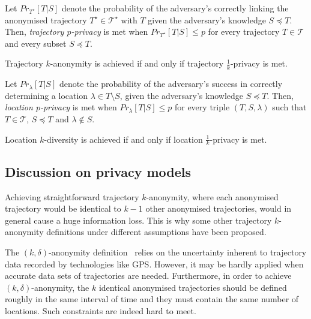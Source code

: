 \begin{definition} \label{def:trajectory_private}
Let $Pr_{T^{\star}}[T|S]$ denote the probability of the
adversary's correctly linking the anonymised
trajectory $T^{\star} \in \mathcal{T}^{\star}$ with $T$ given
the adversary's knowledge $S \preceq T$. Then, \emph{trajectory $p$-privacy}
is met when $Pr_{T^{\star}}[T|S] \leq p$ for every trajectory $T \in \mathcal{T}$ and every subset $S \preceq T$.
\end{definition}

\begin{definition}\label{def:anonymity}
Trajectory $k$-anonymity is achieved if and
only if trajectory $\frac{1}{k}$-privacy is met.
\end{definition}

\begin{definition} \label{def:location_private}
Let $Pr_\lambda[T|S]$ denote the probability of the
adversary's success in correctly determining
a location $\lambda \in T \setminus S$,
given the adversary's knowledge $S \preceq  T$.
Then, \emph{location $p$-privacy} is met
when $Pr_\lambda[T|S] \leq p$ for every triple $(T,S,\lambda)$ such
that $T \in \mathcal{T}$, $S \preceq  T$ and $\lambda \not\in S$.
\end{definition}



\begin{definition}\label{def:diversity}
Location $k$-diversity is achieved if and only
if location $\frac{1}{k}$-privacy is met.
\end{definition}

\subsection{Discussion on privacy models}

Achieving straightforward
trajectory $k$-anonymity, where each anonymised trajectory would
be identical to $k-1$ other anonymised trajectories, would in general
cause a huge information loss.
This is why some other trajectory $k$-anonymity definitions
under different assumptions have been proposed.

The $(k, \delta)$-anonymity definition~\cite{abul08, abul10}
relies on the uncertainty inherent to trajectory data recorded by
technologies like GPS. However, it may be hardly applied
when accurate data sets of trajectories are needed. Furthermore,
in order to achieve $(k, \delta)$-anonymity, the $k$ identical
anonymised trajectories should be defined roughly in the
same interval of time and they must contain the same number of locations.
Such constraints are indeed hard to meet.

